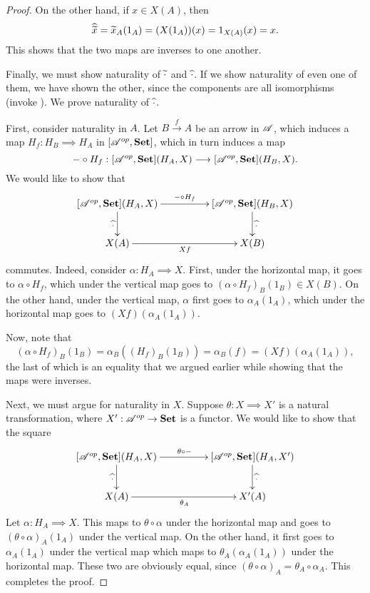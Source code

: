 \begin{proof}
    On the other hand, if $x\in X(A)$, then 
    \begin{equation*}
        \widehat{\widetilde{x}} = \widetilde{x}_A(1_A) = (X(1_A))(x) = 1_{X(A)}(x) = x.
    \end{equation*}
    This shows that the two maps are inverses to one another.

    Finally, we must show naturality of $\widetilde{\cdot}$ and $\widehat{\cdot}$. If we show naturality of even one of them, we have shown the other, since the components are all isomorphisms (invoke ). We prove naturality of $\widehat{\cdot}$.

    First, consider naturality in $A$. Let $B\xrightarrow{f} A$ be an arrow in $\mathscr A$, which induces a map $H_f: H_B\implies H_A$ in $[\mathscr A^{op},\mathbf{Set}]$, which in turn induces a map 
    \begin{equation*}
        -\circ H_f: [\mathscr A^{op}, \mathbf{Set}](H_A, X)\longrightarrow[\mathscr A^{op},\mathbf{Set}](H_B, X).
    \end{equation*}
    We would like to show that 
    \begin{equation*}
        \xymatrix@C+2pc {
            [\scrA^{op},\catSet](H_A, X)\ar[r]^{-\circ H_f}\ar[d]_{\wh{\cdot}} & [\scrA^{op},\catSet](H_B, X)\ar[d]^{\wh{\cdot}}\\
            X(A)\ar[r]_{Xf} & X(B)
        }
    \end{equation*}
    commutes. Indeed, consider $\alpha: H_A\implies X$. First, under the horizontal map, it goes to $\alpha\circ H_f$, which under the vertical map goes to $(\alpha\circ H_f)_B(1_B)\in X(B)$. On the other hand, under the vertical map, $\alpha$ first goes to $\alpha_A(1_A)$, which under the horizontal map goes to $(Xf)(\alpha_A(1_A))$.

    Now, note that 
    \begin{equation*}
        (\alpha\circ H_f)_B(1_B) = \alpha_B((H_f)_B(1_B)) = \alpha_B(f) = (Xf)(\alpha_A(1_A)),
    \end{equation*}
    the last of which is an equality that we argued earlier while showing that the maps were inverses.

    Next, we must argue for naturality in $X$. Suppose $\theta: X\implies X'$ is a natural transformation, where $X': \mathscr A^{op}\to\mathbf{Set}$ is a functor. We would like to show that the square 
    \begin{equation*}
        \xymatrix@C+2pc {
            [\scrA^{op},\catSet](H_A, X)\ar[r]^{\theta\circ-}\ar[d]_{\wh{\cdot}} & [\scrA^{op},\catSet](H_A, X')\ar[d]^{\wh{\cdot}}\\
            X(A)\ar[r]_{\theta_A} & X'(A)
        }
    \end{equation*}
    Let $\alpha: H_A\implies X$. This maps to $\theta\circ\alpha$ under the horizontal map and goes to $(\theta\circ\alpha)_A(1_A)$ under the vertical map. On the other hand, it first goes to $\alpha_A(1_A)$ under the vertical map which maps to $\theta_A(\alpha_A(1_A))$ under the horizontal map. These two are obviously equal, since $(\theta\circ\alpha)_A = \theta_A\circ\alpha_A$. This completes the proof.
\end{proof}
